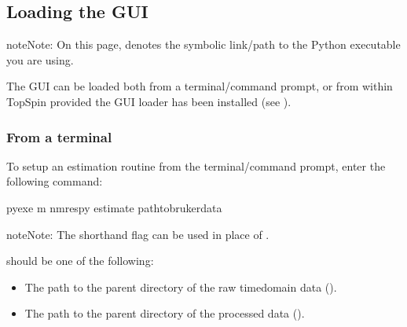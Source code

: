 \documentclass[letterpaper,10pt,english]{sphinxmanual}
\begin{document}
\subsection{Loading the GUI}
\label{\detokenize{gui/usage/loading:loading-the-gui}}\label{\detokenize{gui/usage/loading::doc}}
\begin{sphinxadmonition}{note}{Note:}
\sphinxAtStartPar
On this page,  denotes the symbolic link/path to the Python
executable you are using.
\end{sphinxadmonition}

\sphinxAtStartPar
The GUI can be loaded both from a terminal/command prompt, or from within
TopSpin provided the GUI loader has been installed
(see {\hyperref[\detokenize{gui/topspin_install::doc}]{}}).


\subsubsection{From a terminal}
\label{\detokenize{gui/usage/loading:from-a-terminal}}
\sphinxAtStartPar
To set\sphinxhyphen{}up an estimation routine from the terminal/command prompt,
enter the following command:

\begin{sphinxVerbatim}[commandchars=\\\{\}]
\PYGZdl{} \PYGZlt{}pyexe\PYGZgt{} \PYGZhy{}m nmrespy \PYGZhy{}\PYGZhy{}estimate \PYGZlt{}path\PYGZus{}to\PYGZus{}bruker\PYGZus{}data\PYGZgt{}
\end{sphinxVerbatim}

\begin{sphinxadmonition}{note}{Note:}
\sphinxAtStartPar
The shorthand flag  can be used in place of .
\end{sphinxadmonition}

\sphinxAtStartPar
{} should be one of the following:
\begin{itemize}
\item {} 
\sphinxAtStartPar
The path to the parent directory of the raw time\sphinxhyphen{}domain data ().

\item {} 
\sphinxAtStartPar
The path to the parent directory of the processed data ().

\end{itemize}
\end{document}
